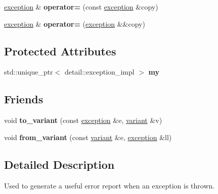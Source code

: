 \begin{DoxyCompactItemize}
\item 
\mbox{\label{classfc_1_1exception_afb0e1fac60179c7b2e171c87d295f690}} 
\mbox{\hyperlink{classfc_1_1exception}{exception}} \& {\bfseries operator=} (const \mbox{\hyperlink{classfc_1_1exception}{exception}} \&copy)
\item 
\mbox{\label{classfc_1_1exception_a4f257882990e94900d31d030be6601b2}} 
\mbox{\hyperlink{classfc_1_1exception}{exception}} \& {\bfseries operator=} (\mbox{\hyperlink{classfc_1_1exception}{exception}} \&\&copy)
\end{DoxyCompactItemize}
\subsection*{Protected Attributes}
\begin{DoxyCompactItemize}
\item 
\mbox{\label{classfc_1_1exception_a91cc1ed42499761c2f750de4a89ce627}} 
std\+::unique\+\_\+ptr$<$ detail\+::exception\+\_\+impl $>$ {\bfseries my}
\end{DoxyCompactItemize}
\subsection*{Friends}
\begin{DoxyCompactItemize}
\item 
\mbox{\label{classfc_1_1exception_a3c086911538b2c7cd63462c1d237c79d}} 
void {\bfseries to\+\_\+variant} (const \mbox{\hyperlink{classfc_1_1exception}{exception}} \&e, \mbox{\hyperlink{classfc_1_1variant}{variant}} \&v)
\item 
\mbox{\label{classfc_1_1exception_a9b482ebad3fb861a17f968e015519e41}} 
void {\bfseries from\+\_\+variant} (const \mbox{\hyperlink{classfc_1_1variant}{variant}} \&e, \mbox{\hyperlink{classfc_1_1exception}{exception}} \&ll)
\end{DoxyCompactItemize}


\subsection{Detailed Description}
Used to generate a useful error report when an exception is thrown.

